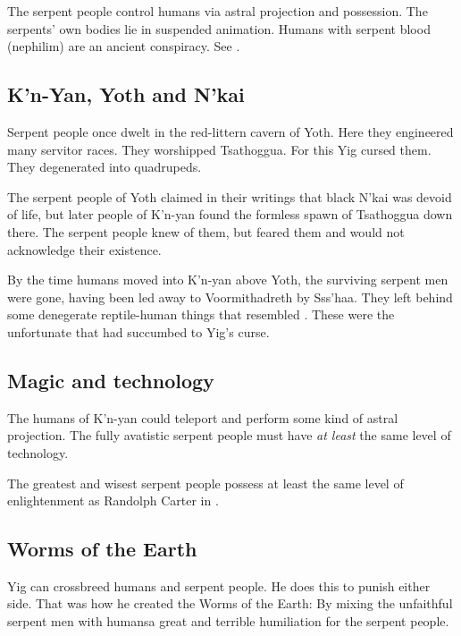 \documentclass[a4paper,12pt,openany,oneside]{book}
\begin{document}
The serpent people control humans via astral projection and possession.
The serpents' own bodies lie in suspended animation.
Humans with serpent blood (nephilim) are an ancient conspiracy.
See \cite{RPG:CallofCthulhu:SecretsofJapan}. 









\subsection{K'n-Yan, Yoth and N'kai}
Serpent people once dwelt in the red-littern cavern of Yoth. 
Here they engineered many servitor races. 
They worshipped Tsathoggua.
For this Yig cursed them.
They degenerated into quadrupeds.

The serpent people of Yoth claimed in their writings that black N'kai was devoid of life, but later people of K'n-yan found the formless spawn of Tsathoggua down there.
The serpent people knew of them, but feared them and would not acknowledge their existence. 

By the time humans moved into K'n-yan above Yoth, the surviving serpent men were gone, having been led away to Voormithadreth by Sss'haa. 
They left behind some denegerate reptile-human things that resembled . 
These were the unfortunate that had succumbed to Yig's curse.









\subsection{Magic and technology}

The humans of K'n-yan could teleport and perform some kind of astral projection.
The fully avatistic serpent people must have \emph{at least} the same level of technology. 

The greatest and wisest serpent people possess at least the same level of enlightenment as Randolph Carter in \cite{HPLovecraft:ThroughtheGatesoftheSilverKey}. 









\subsection{Worms of the Earth}
Yig can crossbreed humans and serpent people.
He does this to punish either side. 
That was how he created the Worms of the Earth: 
By mixing the unfaithful serpent men with humans\dash a great and terrible humiliation for the serpent people. 
\end{document}
